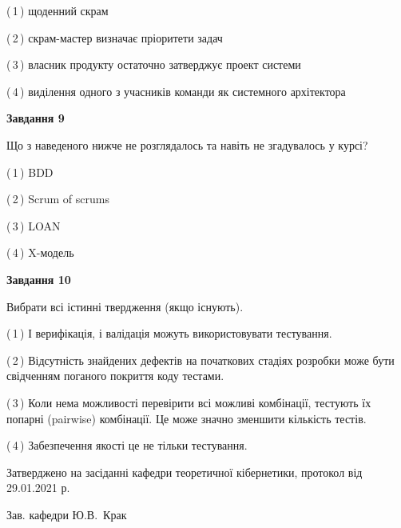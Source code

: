 \documentclass[10pt, ukrainian]{article}
\begin{document}
{\begin {large}
(\,1\,) щоденний скрам%



(\,2\,) скрам-мастер визначає пріоритети задач%



(\,3\,) власник продукту остаточно затверджує проект системи%



(\,4\,) виділення одного з учасників команди як системного архітектора%


{\begin {center}\textbf{Завдання 9}\end {center}}\par
Що з наведеного нижче не розглядалось та навіть не згадувалось у курсі?\par
\vspace{2mm}



(\,1\,) BDD%



(\,2\,) Scrum of scrums%



(\,3\,) LOAN%



(\,4\,) X-модель%


{\begin {center}\textbf{Завдання 10}\end {center}}\par
Вибрати всі істинні твердження (якщо існують).\par
\vspace{2mm}



(\,1\,) І верифікація, і валідація можуть використовувати тестування.%



(\,2\,) Відсутність знайдених дефектів на початкових стадіях розробки може бути свідченням поганого покриття коду тестами.%



(\,3\,) Коли нема можливості перевірити всі можливі комбінації, тестують їх попарні (pairwise) комбінації. Це може значно зменшити кількість тестів.%



(\,4\,) Забезпечення якості це не тільки тестування.%



\end {large}}
{\vspace{5mm}\smallskip \begin {small} Затверджено на засіданні кафедри теоретичної кібернетики, протокол  від   29.01.2021 р.\par\smallskip\smallskip
{\parbox {6.5 cm}{Зав. кафедри \dotfill Ю.В.~Крак}} \end{small}}
\newpage
\end{document}
